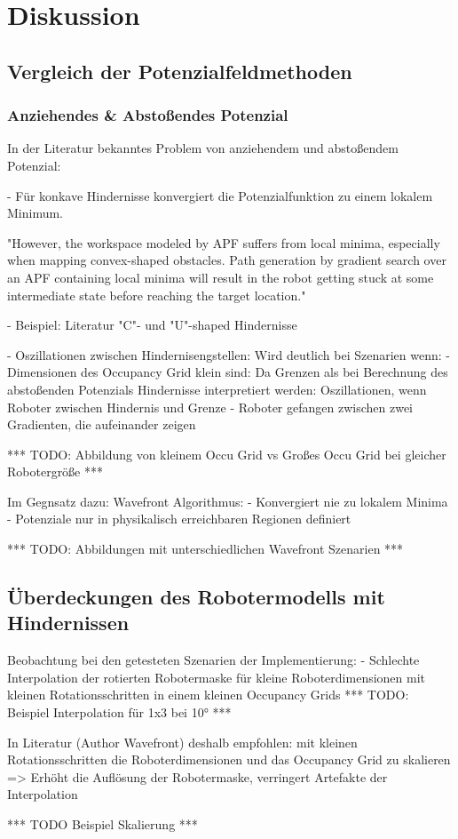 \chapter{Diskussion}

\section{Vergleich der Potenzialfeldmethoden}

\subsection*{Anziehendes \& Abstoßendes Potenzial}

In der Literatur bekanntes Problem von anziehendem und abstoßendem Potenzial: 


- Für konkave Hindernisse konvergiert die Potenzialfunktion zu einem lokalem Minimum.

"However, the workspace modeled by APF suffers from local minima, especially when mapping convex-shaped obstacles. Path generation by gradient search over an APF containing local minima will result in the robot getting stuck at some intermediate state before reaching the target location." \cite{maqbool.2021}

	- Beispiel: Literatur "C"- und "U"-shaped Hindernisse \cite{yujiang.2017}


- Oszillationen zwischen Hindernisengstellen:
	Wird deutlich bei Szenarien wenn:
	- Dimensionen des Occupancy Grid klein sind: Da Grenzen als bei Berechnung des abstoßenden Potenzials Hindernisse interpretiert werden: Oszillationen, wenn Roboter zwischen Hindernis und Grenze
	- Roboter gefangen zwischen zwei Gradienten, die aufeinander zeigen

*** TODO: Abbildung von kleinem Occu Grid vs Großes Occu Grid bei gleicher Robotergröße ***


Im Gegnsatz dazu: Wavefront Algorithmus: 
	- Konvergiert nie zu lokalem Minima
	- Potenziale nur in physikalisch erreichbaren Regionen definiert

*** TODO: Abbildungen mit unterschiedlichen Wavefront Szenarien ***


\section{Überdeckungen des Robotermodells mit Hindernissen}

Beobachtung bei den getesteten Szenarien der Implementierung: 
- Schlechte Interpolation der rotierten Robotermaske für kleine Roboterdimensionen mit kleinen Rotationsschritten in einem kleinen Occupancy Grids
 *** TODO: Beispiel Interpolation für 1x3 bei 10° ***

In Literatur (Author Wavefront) deshalb empfohlen: mit kleinen Rotationsschritten die Roboterdimensionen und das Occupancy Grid zu skalieren
=> Erhöht die Auflösung der Robotermaske, verringert Artefakte der Interpolation

*** TODO Beispiel Skalierung ***